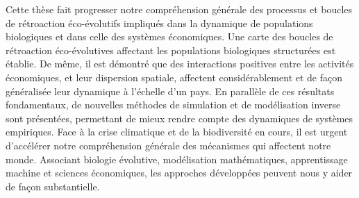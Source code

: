 {Cette thèse fait progresser notre compréhension générale des processus et boucles de rétroaction éco-évolutifs impliqués dans la dynamique de populations biologiques et dans celle des systèmes économiques. Une carte des boucles de rétroaction éco-évolutives affectant les populations biologiques structurées est établie. De même, il est démontré que des interactions positives entre les activités économiques, et leur dispersion spatiale, affectent considérablement et de façon généralisée leur dynamique à l'échelle d'un pays. En parallèle de ces résultats fondamentaux, de nouvelles méthodes de simulation et de modélisation inverse sont présentées, permettant de mieux rendre compte des dynamiques de systèmes empiriques. Face à la crise climatique et de la biodiversité en cours, il est urgent d'accélérer notre compréhension générale des mécanismes qui affectent notre monde. Associant biologie évolutive, modélisation mathématiques, apprentissage machine et sciences économiques, les approches développées peuvent nous y aider de façon substantielle.}


